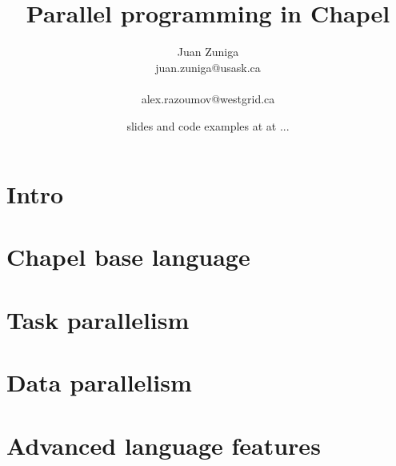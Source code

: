 \documentclass[xcolor=svgnames]{beamer}
\begin{document}
\title[VisIt Workshop]{\LARGE Parallel programming in Chapel}
\author[]{{\large\sc Juan Zuniga}\\{\small juan.zuniga@usask.ca}\\\\{\small alex.razoumov@westgrid.ca}}
\date[May 2017]{\textcolor{byzantium}{\footnotesize slides and code examples at at ...}}

\begin{frame}
  \titlepage
\end{frame}

\section{Intro}
\subsection{} %


\section{Chapel base language}
\subsection{} %

\section{Task parallelism}
\subsection{} %

\section{Data parallelism}
\subsection{} %

\section{Advanced language features}
\subsection{} %
\end{document}
